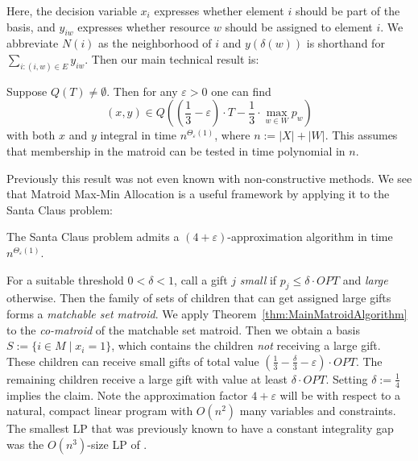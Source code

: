 Here, the decision variable $x_i$ expresses whether element $i$ should be part of the basis, and
$y_{iw}$ expresses whether resource $w$ should be assigned to element $i$. We abbreviate 
$N(i)$ as the neighborhood of $i$ and $y(\delta(w))$ is shorthand for $\sum_{i : (i,w) \in E} y_{iw}$.
Then our main technical result is: 
\begin{theorem} \label{thm:MainMatroidAlgorithm}
Suppose $Q(T) \neq \emptyset$. Then for any $\varepsilon>0$ one can find
 \[
   (x,y) \in Q \left (
    \left (\frac13 - \varepsilon \right ) \cdot T - \frac13 \cdot \max_{w \in W} p_w \right )
 \] 
with both $x$ and $y$ integral in time $n^{\Theta_{\varepsilon}(1)}$, where $n := |X| + |W|$.
This assumes that membership in the matroid can be tested in time polynomial in $n$. 
\end{theorem}
Previously this result was not even known with non-constructive methods. 
We see that Matroid Max-Min Allocation is a useful framework by applying it to the Santa Claus problem:

\begin{theorem}
The Santa Claus problem admits a $(4+\varepsilon)$-approximation algorithm in time
$n^{\Theta_{\varepsilon}(1)}$. 
\end{theorem}

For a suitable threshold $0<\delta<1$, call a gift $j$ \emph{small} 
if $p_j \leq \delta \cdot OPT$ and \emph{large} otherwise. Then the family of sets of children that can get 
assigned large gifts forms a \emph{matchable set matroid}. We apply 
Theorem~\ref{thm:MainMatroidAlgorithm} to the \emph{co-matroid} of the matchable set matroid.
Then we obtain a basis $S := \{ i \in M \mid x_i=1\}$, 
which contains the children \emph{not} receiving a large gift. 
These children can receive small gifts of total value $( \frac{1}{3}- \frac{\delta}{3} -\varepsilon) \cdot OPT$. 
The remaining children receive a large gift with value at least $\delta \cdot OPT$.
Setting $\delta := \frac{1}{4}$ implies the claim. 
Note the approximation factor $4+\varepsilon$ will be with respect to a natural, 
compact linear program with $O(n^2)$ many variables and constraints. 
The smallest LP that was previously known to have a constant integrality gap was the $O(n^3)$-size LP of \cite{CompactLPforAllocationProblems-JansenRohwedder-SOSA18}.


